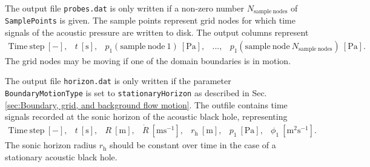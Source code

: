 The output file {\tt probes.dat} is only written if a non-zero number $N_{\mathrm{sample\:nodes}}$ of {\tt SamplePoints} is given. The sample points represent grid nodes for which time signals of the acoustic pressure are written to disk. The output columns represent
\begin{equation}
\begin{array}{lllll}
  \mathrm{Time\:step\:\left[-\right]},
& t\:\mathrm{\left[s\right]},
& p_1\left(\mathrm{sample\:node\:1}\right)\:\mathrm{\left[Pa\right]},
& ...,
& p_1\left(\mathrm{sample\:node\:}N_{\mathrm{sample\:nodes}}\right)\:\mathrm{\left[Pa\right]}.
\end{array}
\nonumber
\end{equation}
The grid nodes may be moving if one of the domain boundaries is in motion.

The output file {\tt horizon.dat} is only written if the parameter {\tt BoundaryMotionType} is set to {\tt stationaryHorizon} as described in Sec. \ref{sec:Boundary, grid, and background flow motion}. The outfile contains time signals recorded at the sonic horizon of the acoustic black hole, representing
\begin{equation}
\begin{array}{lllllll}
  \mathrm{Time\:step\:\left[-\right]},
& t\:\mathrm{\left[s\right]},
& R\:\mathrm{\left[m\right]},
& \dot R\:\mathrm{\left[ms^{-1}\right]},
& r_{\mathrm{h}}\:\mathrm{\left[m\right]},
& p_1\:\mathrm{\left[Pa\right]},
& \phi_1\:\mathrm{\left[m^2s^{-1}\right]}.
\end{array}
\nonumber
\end{equation}
The sonic horizon radius $r_{\mathrm{h}}$ should be constant over time in the case of a stationary acoustic black hole.
